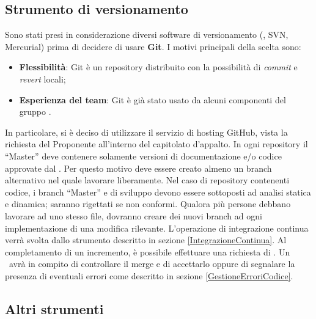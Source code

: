 \documentclass[../NormeDiProgetto.tex]{subfiles}
\begin{document}
		\subsection{Strumento di versionamento}\label{StrumentoDiVersionamento}
			Sono stati presi in considerazione diversi software di versionamento (, SVN, Mercurial)
			prima di decidere di usare \textbf{Git}. I motivi principali della scelta sono: 
			\begin{itemize}
				\item \textbf{Flessibilità}: Git è un repository distribuito con la possibilità di
				\textit{commit} e \textit{revert} locali;
				\item \textbf{Esperienza del team}: Git è già stato usato da alcuni componenti
				del gruppo \kaleidoscode.
			\end{itemize}
			In particolare, si è deciso di utilizzare il servizio di hosting GitHub, vista la richiesta
			del Proponente all'interno del capitolato d'appalto.
			In ogni repository il  ``Master'' deve contenere solamente versioni di documentazione e/o
			codice approvate dal \responsabilediprogetto. Per questo motivo deve essere creato almeno un
			branch alternativo nel quale lavorare liberamente.
			Nel caso di repository contenenti codice, i branch ``Master'' e di sviluppo devono essere
			sottoposti ad analisi statica e dinamica; saranno rigettati se non conformi.
			Qualora più persone debbano lavorare ad uno stesso file, dovranno creare dei nuovi branch ad ogni
			implementazione di una modifica rilevante.
			L'operazione di integrazione continua verrà svolta dallo strumento descritto in sezione
			\ref{IntegrazioneContinua}.
			Al completamento di un incremento, è possibile effettuare una richiesta di .
			Un \verificatore\ avrà in compito di controllare il merge e di accettarlo oppure di segnalare
			la presenza di eventuali errori come descritto in sezione \ref{GestioneErroriCodice}.
		\subsection{Altri strumenti}
\end{document}
